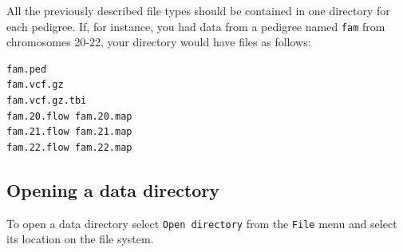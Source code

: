 \documentclass{article}
\begin{document}
All the previously described file types should be contained in one directory for each pedigree. If, for instance, you had data from a pedigree named \texttt{fam} from chromosomes 20-22, your directory would have files as follows:

\begin{verbatim}
fam.ped
fam.vcf.gz
fam.vcf.gz.tbi
fam.20.flow fam.20.map
fam.21.flow fam.21.map
fam.22.flow fam.22.map
\end{verbatim}

\subsection{Opening a data directory}
To open a data directory select \texttt{Open directory} from the \texttt{File} menu and select its location on the file system.
\end{document}
